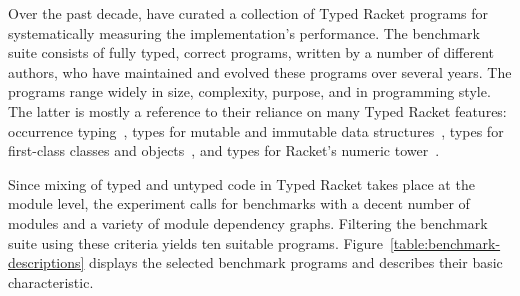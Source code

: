 
Over the past decade, \citet{gtnffvf-jfp-2019} have curated a collection of
Typed Racket programs for systematically measuring the implementation's
performance. The benchmark suite consists of fully typed, correct programs,
written by a number of different authors, who have maintained and evolved these
programs over several years. The programs range widely in size, complexity,
purpose, and in programming style. The latter is mostly a reference to their
reliance on many Typed Racket features: occurrence typing~\cite{tf-icfp-2010},
types for mutable and immutable data structures~\cite{hpst-sfp-2010}, types for
first-class classes and objects~\cite{tsdtf-oopsla-2012}, and types for Racket's
numeric tower~\cite{stathff-padl-12}.

Since mixing of typed and untyped code in Typed Racket takes place at the module
level, the experiment calls for benchmarks with a decent number of modules and a
variety of module dependency graphs. Filtering the benchmark suite using these
criteria yields ten suitable programs. Figure~\ref{table:benchmark-descriptions}
displays the selected benchmark programs and describes their basic
characteristic. 
